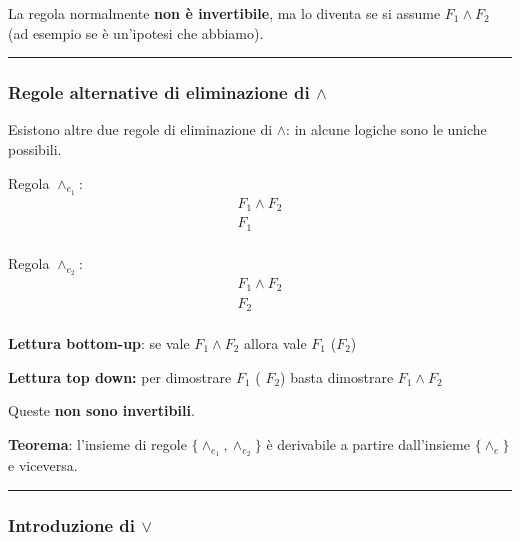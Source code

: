 \documentclass[
  a4paper,
]{article}
\begin{document}
La regola normalmente \textbf{non è invertibile}, ma lo diventa se si
assume \(F_1 \land F_2\) (ad esempio se è un'ipotesi che abbiamo).

\par\noindent\rule{\linewidth}{0.4pt}\par\vspace{6pt}

\hypertarget{regole-alternative-di-eliminazione-di-land}{%
\subsubsection{\texorpdfstring{Regole alternative di eliminazione di
\(\land\)}{Regole alternative di eliminazione di \textbackslash land}}\label{regole-alternative-di-eliminazione-di-land}}

Esistono altre due regole di eliminazione di \(\land\): in alcune
logiche sono le uniche possibili.

Regola \(\land_{e_1}\): \[
\begin{matrix} 
F_1 \land F_2 \\
\hline
F_1 \\
\end{matrix}
\]

Regola \(\land_{e_2}\): \[
\begin{matrix} 
F_1 \land F_2 \\
\hline
F_2 \\
\end{matrix}
\]

\textbf{Lettura bottom-up}: se vale \(F_1 \land F_2\) allora vale
\(F_1\) (\(F_2\))

\textbf{Lettura top down:} per dimostrare \(F_1\) ( \(F_2\)) basta
dimostrare \(F_1 \land F_2\)

Queste \textbf{non sono invertibili}.

\textbf{Teorema}: l'insieme di regole \(\{\land_{e_1} , \land_{e_2} \}\)
è derivabile a partire dall'insieme \(\{\land_e\}\) e viceversa.

\par\noindent\rule{\linewidth}{0.4pt}\par\vspace{6pt}

\hypertarget{introduzione-di-lor}{%
\subsubsection{\texorpdfstring{Introduzione di
\(\lor\)}{Introduzione di \textbackslash lor}}\label{introduzione-di-lor}}
\end{document}
